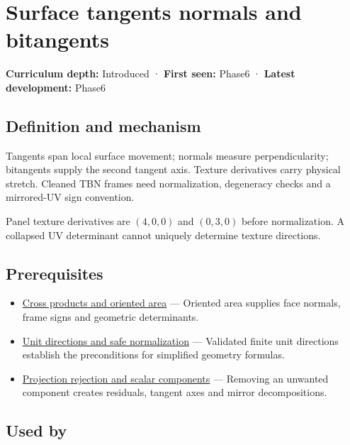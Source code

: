 \hypertarget{appendix-e31893dec985}{}\label{referencestart:appendix-e31893dec985}
\section{Surface tangents normals and bitangents}\label{appendix-e31893dec985-surface-tangents-normals-and-bitangents}

\textbf{Curriculum depth:} Introduced · \textbf{First seen:} Phase6 · \textbf{Latest development:} Phase6

\subsection{Definition and mechanism}\label{appendix-e31893dec985-definition-and-mechanism}

Tangents span local surface movement; normals measure perpendicularity; bitangents supply the second tangent axis. Texture derivatives carry physical stretch. Cleaned TBN frames need normalization, degeneracy checks and a mirrored-UV sign convention.

Panel texture derivatives are \((4,0,0)\) and \((0,3,0)\) before normalization. A collapsed UV determinant cannot uniquely determine texture directions.

\subsection{Prerequisites}\label{appendix-e31893dec985-prerequisites}

\begin{itemize}
\tightlist
\item
  \hyperref[appendix-2391db8052b1]{Cross products and oriented area} --- Oriented area supplies face normals, frame signs and geometric determinants.
\item
  \hyperref[appendix-f744e41b95b4]{Unit directions and safe normalization} --- Validated finite unit directions establish the preconditions for simplified geometry formulas.
\item
  \hyperref[appendix-505a502c372a]{Projection rejection and scalar components} --- Removing an unwanted component creates residuals, tangent axes and mirror decompositions.
\end{itemize}

\subsection{Used by}\label{appendix-e31893dec985-used-by}

